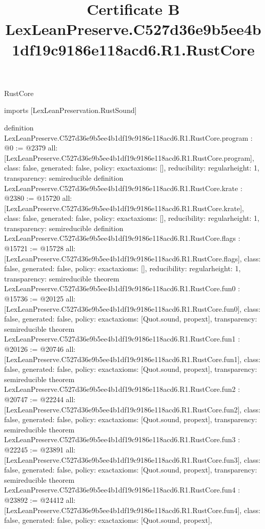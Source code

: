 \begin{lexlean}{RustCore}
\title{Certificate B LexLeanPreserve.C527d36e9b5ee4b1df19c9186e118acd6.R1.RustCore}
\begin{coremodule}
imports [LexLeanPreservation.RustSound]

definition LexLeanPreserve.C527d36e9b5ee4b1df19c9186e118acd6.R1.RustCore.program : @0 := @2379 {
  all: [LexLeanPreserve.C527d36e9b5ee4b1df19c9186e118acd6.R1.RustCore.program],
  class: false,
  generated: false,
  policy: exact{axioms: []},
  reducibility: regular{height: 1},
  transparency: semireducible
}
definition LexLeanPreserve.C527d36e9b5ee4b1df19c9186e118acd6.R1.RustCore.krate : @2380 := @15720 {
  all: [LexLeanPreserve.C527d36e9b5ee4b1df19c9186e118acd6.R1.RustCore.krate],
  class: false,
  generated: false,
  policy: exact{axioms: []},
  reducibility: regular{height: 1},
  transparency: semireducible
}
definition LexLeanPreserve.C527d36e9b5ee4b1df19c9186e118acd6.R1.RustCore.flags : @15721 := @15728 {
  all: [LexLeanPreserve.C527d36e9b5ee4b1df19c9186e118acd6.R1.RustCore.flags],
  class: false,
  generated: false,
  policy: exact{axioms: []},
  reducibility: regular{height: 1},
  transparency: semireducible
}
theorem LexLeanPreserve.C527d36e9b5ee4b1df19c9186e118acd6.R1.RustCore.fun0 : @15736 := @20125 {
  all: [LexLeanPreserve.C527d36e9b5ee4b1df19c9186e118acd6.R1.RustCore.fun0],
  class: false,
  generated: false,
  policy: exact{axioms: [Quot.sound, propext]},
  transparency: semireducible
}
theorem LexLeanPreserve.C527d36e9b5ee4b1df19c9186e118acd6.R1.RustCore.fun1 : @20126 := @20746 {
  all: [LexLeanPreserve.C527d36e9b5ee4b1df19c9186e118acd6.R1.RustCore.fun1],
  class: false,
  generated: false,
  policy: exact{axioms: [Quot.sound, propext]},
  transparency: semireducible
}
theorem LexLeanPreserve.C527d36e9b5ee4b1df19c9186e118acd6.R1.RustCore.fun2 : @20747 := @22244 {
  all: [LexLeanPreserve.C527d36e9b5ee4b1df19c9186e118acd6.R1.RustCore.fun2],
  class: false,
  generated: false,
  policy: exact{axioms: [Quot.sound, propext]},
  transparency: semireducible
}
theorem LexLeanPreserve.C527d36e9b5ee4b1df19c9186e118acd6.R1.RustCore.fun3 : @22245 := @23891 {
  all: [LexLeanPreserve.C527d36e9b5ee4b1df19c9186e118acd6.R1.RustCore.fun3],
  class: false,
  generated: false,
  policy: exact{axioms: [Quot.sound, propext]},
  transparency: semireducible
}
theorem LexLeanPreserve.C527d36e9b5ee4b1df19c9186e118acd6.R1.RustCore.fun4 : @23892 := @24412 {
  all: [LexLeanPreserve.C527d36e9b5ee4b1df19c9186e118acd6.R1.RustCore.fun4],
  class: false,
  generated: false,
  policy: exact{axioms: [Quot.sound, propext]},
}
\end{coremodule}
\end{lexlean}
